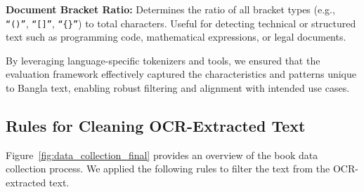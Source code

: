 
\noindent \textbf{Document Bracket Ratio:}  
Determines the ratio of all bracket types (e.g., \texttt{``()''}, \texttt{``[]''}, \texttt{``\{\}''}) to total characters. Useful for detecting technical or structured text such as programming code, mathematical expressions, or legal documents.


 By leveraging language-specific tokenizers and tools, we ensured that the evaluation framework effectively captured the characteristics and patterns unique to Bangla text, enabling robust filtering and alignment with intended use cases.

\subsection{Rules for Cleaning OCR-Extracted Text}
\label{ssec:app_rules_google_ocr}
Figure~\ref{fig:data_collection_final} provides an overview of the book data collection process. 
We applied the following rules to filter the text from the OCR-extracted text. 


